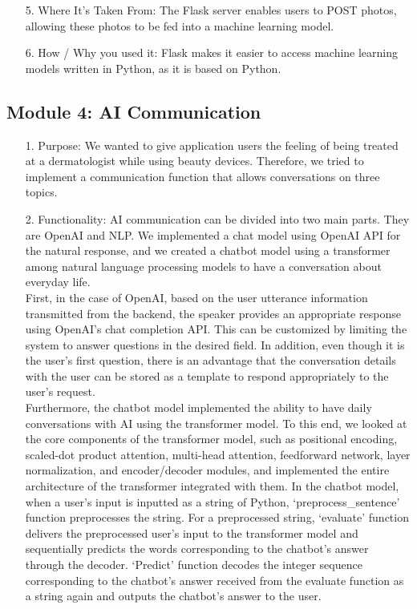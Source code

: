 \documentclass[conference]{IEEEtran}
\begin{document}
\begin{itemize}
    \item[5.] Where It's Taken From: The Flask server enables users to POST photos, allowing these photos to be fed into a machine learning model.
\\ 
    \item[6.] How / Why you used it: Flask makes it easier to access machine learning models written in Python, as it is based on Python.

\end{itemize}
    
    

\subsection{Module 4: AI Communication}
\begin{itemize}
    \item [1.] Purpose: We wanted to give application users the feeling of being treated at a dermatologist while using beauty devices. Therefore, we tried to implement a communication function that allows conversations on three topics. \\
    
    \item[2.] Functionality: AI communication can be divided into two main parts. They are OpenAI and NLP. We implemented a chat model using OpenAI API for the natural response, and we created a chatbot model using a transformer among natural language processing models to have a conversation about everyday life. \\
    First, in the case of OpenAI, based on the user utterance information transmitted from the backend, the speaker provides an appropriate response using OpenAI's chat completion API. This can be customized by limiting the system to answer questions in the desired field. In addition, even though it is the user's first question, there is an advantage that the conversation details with the user can be stored as a template to respond appropriately to the user's request.\\
    Furthermore, the chatbot model implemented the ability to have daily conversations with AI using the transformer model. To this end, we looked at the core components of the transformer model, such as positional encoding, scaled-dot product attention, multi-head attention, feedforward network, layer normalization, and encoder/decoder modules, and implemented the entire architecture of the transformer integrated with them. In the chatbot model, when a user's input is inputted as a string of Python, ‘preprocess\_sentence’ function preprocesses the string. For a preprocessed string, ‘evaluate’ function delivers the preprocessed user's input to the transformer model and sequentially predicts the words corresponding to the chatbot's answer through the decoder. ‘Predict’ function decodes the integer sequence corresponding to the chatbot's answer received from the evaluate function as a string again and outputs the chatbot's answer to the user.
\\
    

\end{itemize}
\end{document}
